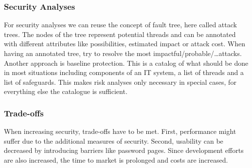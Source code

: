 \subsubsection{Security Analyses}
For security analyses we can reuse the concept of fault tree, here called attack trees.
The nodes of the tree represent potential threads and can be annotated with different attributes like possibilities, estimated impact or attack cost.
When having an annotated tree, try to resolve the most impactful/probable/\ldots attacks.\\
Another approach is baseline protection.
This is a catalog of what should be done in most situations including components of an IT system, a list of threads and a list of safeguards.
This makes risk analyses only necessary in special cases, for everything else the catalogue is sufficient.

\subsubsection{Trade-offs}
When increasing security, trade-offs have to be met.
First, performance might suffer due to the additional measures of security.
Second, usability can be decreased by introducing barriers like password pages.
Since development efforts are also increased, the time to market is prolonged and costs are increased.

